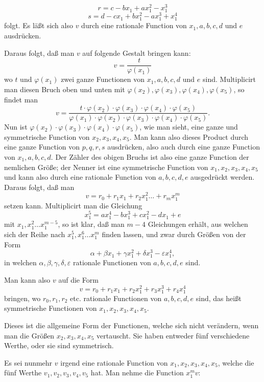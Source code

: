 \documentclass{article}
\begin{document}
\[ r = c - bx_1 + ax_1^{2} - x_1^{3} \]
\[ s = d - cx_1 + bx_1^{2} - ax_1^{3} + x_1^{4} \]
folgt. Es läßt sich also $v$ durch eine rationale Function von $x_1, a, b, c, d$ und $e$ ausdrücken.

Daraus folgt, daß man $v$ auf folgende Gestalt bringen kann:
\[ v = \frac{t}{\varphi(x_1)} \]
wo $t$ und $\varphi(x_1)$ zwei ganze Functionen von $x_1, a, b, c, d$ und $e$ sind. Multiplicirt man diesen Bruch oben und unten mit $\varphi(x_2), \varphi(x_3), \varphi(x_4), \varphi(x_5)$, so findet man
\[ v = \frac{t \cdot \varphi(x_2) \cdot \varphi(x_3) \cdot \varphi(x_4) \cdot \varphi(x_5)}{\varphi(x_1) \cdot \varphi(x_2) \cdot \varphi(x_3) \cdot \varphi(x_4) \cdot \varphi(x_5)}. \]
Nun ist $\varphi(x_2) \cdot \varphi(x_3) \cdot \varphi(x_4) \cdot \varphi(x_5)$, wie man sieht, eine ganze und symmetrische Function von $x_2, x_3, x_4, x_5$. Man kann also dieses Product durch eine ganze Function von $p, q, r, s$ ausdrücken, also auch durch eine ganze Function von $x_1, a, b, c, d$. Der Zähler des obigen Bruchs ist also eine ganze Function der nemlichen Größe; der Nenner ist eine symmetrische Function von $x_1, x_2, x_3, x_4, x_5$ und kann also durch eine rationale Function von $a, b, c, d, e$ ausgedrückt werden. Daraus folgt, daß man
\[ v = r_0 + r_1 x_1 + r_2 x_1^{2} \ldots + r_m x_1^{m} \]
setzen kann. Multiplicirt man die Gleichung
\[ x_1^{5} = ax_1^{4} - bx_1^{3} + cx_1^{2} - dx_1 + e \]
mit $x_1, x_1^{2} \ldots x_1^{m-5}$, so ist klar, daß man $m - 4$ Gleichungen erhält, aus welchen sich der Reihe nach $x_1^{5}, x_1^{6} \ldots x_1^{m}$ finden lassen, und zwar durch Größen von der Form
\[ \alpha + \beta x_1 + \gamma x_1^{2} + \delta x_1^{3} - \varepsilon x_1^{4}, \]
in welchen $\alpha, \beta, \gamma, \delta, \varepsilon$ rationale Functionen von $a, b, c, d, e$ sind.

Man kann also $v$ auf die Form
\[ v = r_0 + r_1 x_1 + r_2 x_1^{2} + r_3 x_1^{3} + r_4 x_1^{4} \tag{a} \]
bringen, wo $r_0, r_1, r_2$ etc. rationale Functionen von $a, b, c, d, e$ sind, das heißt symmetrische Functionen von $x_1, x_2, x_3, x_4, x_5$.

Dieses ist die allgemeine Form der Functionen, welche sich nicht verändern, wenn man die Größen $x_2, x_3, x_4, x_5$ vertauscht. Sie haben entweder fünf verschiedene Werthe, oder sie sind symmetrisch.

Es sei nunmehr $v$ irgend eine rationale Function von $x_1, x_2, x_3, x_4, x_5$, welche die fünf Werthe $v_1, v_2, v_3, v_4, v_5$ hat. Man nehme die Function $x_1^{m} v$:
\end{document}
